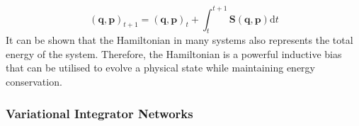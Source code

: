 \documentclass{article}
\begin{document}
\begin{equation}
(\mathbf{q},\mathbf{p})_{t+1} = (\mathbf{q},\mathbf{p})_t + \int_t^{t+1} \mathbf{S}(\mathbf{q},\mathbf{p}) \mathrm{d}t
\label{eqn.action_int}
\end{equation}
It can be shown that the Hamiltonian in many systems also represents the total energy of the system. Therefore, the Hamiltonian is a powerful inductive bias that can be utilised to evolve a physical state while maintaining energy conservation.

\subsubsection{Variational Integrator Networks}
\end{document}
